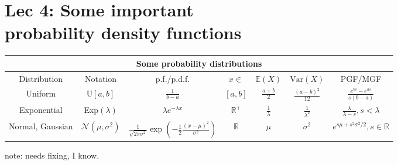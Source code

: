 \chapter[Lec 4: Some important probability density functions]{Lec 4: Some important \\probability density functions}


\begin{tabular}{ |c|c||c|c|c|c|c|  }
    \hline
    \multicolumn{7}{|c|}{Some probability distributions} \\
    \hline
    Distribution & Notation & p.f./p.d.f. & \(x\in\) & \(\mathbb{E}(X)\)& \(\text{Var}(X)\) & PGF/MGF\\
    \hline
    Uniform & U\([a,b]\) & \(\frac{1}{b-a}\) & \([a,b]\) & \(\frac{a+b}{2}\) & \(\frac{\left(a-b\right)^2}{12}\) & \(\frac{e^{bs}-e^{as}}{s(b-a)}\)\\
    Exponential & Exp\((\lambda)\) & \(\lambda e^{-\lambda x}\) & \(\mathbb{R}^+\) & \(\frac{1}{\lambda}\)& \(\frac{1}{\lambda^2}\) & \(\frac{\lambda}{\lambda - s}, s<\lambda\)\\
    Normal, Gaussian & \(\mathcal{N}(\mu,\sigma^2)\) & \(\frac{1}{\sqrt{2\pi\sigma^2}}\exp\left(-\frac{1}{2}\frac{(x-\mu)^2}{\sigma^2}\right)\) & \(\mathbb{R}\) & \(\mu\)& \(\sigma^2\) & \(e^{s\mu+s^2\sigma^2/2}, s\in\mathbb{R}\)\\
    \hline
\end{tabular}

note: needs fixing, I know. 